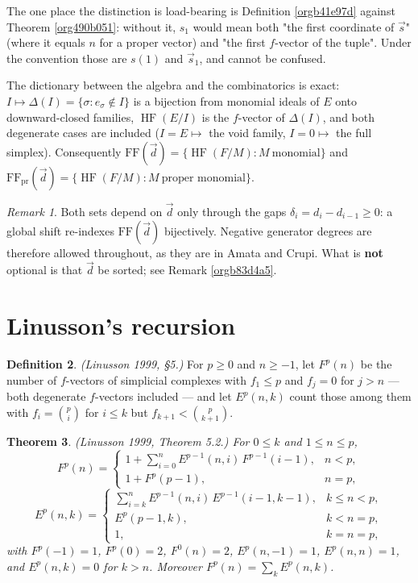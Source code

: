 \documentclass[11pt, a4paper, abstract=yes]{scrartcl}
\theoremstyle{definition}
\newtheorem{definition}{Definition}
\theoremstyle{remark}
\newtheorem{remark}[definition]{Remark}
\theoremstyle{plain}
\newtheorem{theorem}[definition]{Theorem}
\newcommand{\vek}[1]{\boldsymbol{#1}}
\newcommand{\HF}{\operatorname{HF}}
\renewcommand{\vek}[1]{\vec{#1}}
\begin{document}
The one place the distinction is load-bearing is Definition \ref{orgb41e97d} against
Theorem \ref{org490b051}: without it, \(s_1\) would mean both "the first coordinate of \(\vek s\)"
(where it equals \(n\) for a proper vector) and "the first \(f\)-vector of the tuple". Under the
convention those are \(s(1)\) and \(\vek s_1\), and cannot be confused.

The dictionary between the algebra and the combinatorics is exact: \(I\mapsto\Delta(I)=\lbrace\sigma:
e_\sigma\notin I\rbrace\) is a bijection from monomial ideals of \(E\) onto downward-closed families,
\(\HF(E/I)\) is the \(f\)-vector of \(\Delta(I)\), and both degenerate cases are included
(\(I=E\mapsto\) the void family, \(I=0\mapsto\) the full simplex). Consequently
\(\mathrm{FF}(\vek d)=\lbrace\HF(F/M):M\ \text{monomial}\rbrace\) and
\(\mathrm{FF}_{\mathrm{pr}}(\vek d)=\lbrace\HF(F/M):M\ \text{proper monomial}\rbrace\).

\begin{remark}
Both sets depend on \(\vek d\) only through the gaps \(\delta_i=d_i-d_{i-1}\ge0\): a global shift
re-indexes \(\mathrm{FF}(\vek d)\) bijectively. Negative generator degrees are therefore allowed
throughout, as they are in Amata and Crupi. What is \textbf{not} optional is that \(\vek d\) be sorted; see
Remark \ref{orgb83d4a5}.
\label{org3777dfb}
\end{remark}
\section{Linusson's recursion}
\label{sec:orgef5314e}
\begin{definition}
\emph{(Linusson 1999, \S5.)} For \(p\ge0\) and \(n\ge-1\), let \(F^p(n)\) be the number of \(f\)-vectors of
simplicial complexes with \(f_1\le p\) and \(f_j=0\) for \(j>n\) --- both degenerate \(f\)-vectors
included --- and let \(E^p(n,k)\) count those among them with \(f_i=\binom pi\) for \(i\le k\) but
\(f_{k+1}<\binom p{k+1}\).
\label{org746bcee}
\end{definition}

\begin{theorem}
\emph{(Linusson 1999, Theorem 5.2.)} For \(0\le k\) and \(1\le n\le p\),
\[
  F^p(n)=\begin{cases}
    1+\sum_{i=0}^{n}E^{p-1}(n,i)\,F^{p-1}(i-1), & n<p,\\
    1+F^p(p-1), & n=p,
  \end{cases}
\]
\[
  E^p(n,k)=\begin{cases}
    \sum_{i=k}^{n}E^{p-1}(n,i)\,E^{p-1}(i-1,k-1), & k\le n<p,\\
    E^p(p-1,k), & k<n=p,\\
    1, & k=n=p,
  \end{cases}
\]
with \(F^p(-1)=1\), \(F^p(0)=2\), \(F^0(n)=2\), \(E^p(n,-1)=1\), \(E^p(n,n)=1\), and
\(E^p(n,k)=0\) for \(k>n\). Moreover \(F^p(n)=\sum_kE^p(n,k)\).
\label{orga133f2c}
\end{theorem}
\end{document}
